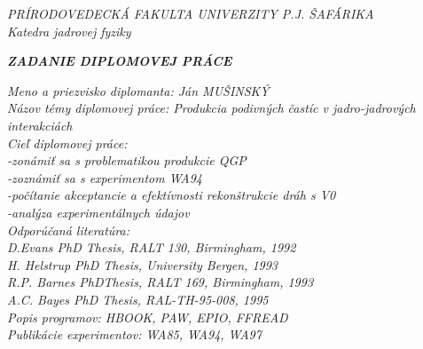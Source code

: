 \begin{titlepage}
  \parindent 0cm
  \begin{center}
    {\it PRÍRODOVEDECKÁ FAKULTA UNIVERZITY P.J. ŠAFÁRIKA \\
      Katedra jadrovej fyziky} \\
  \end{center}
  \vspace*{0.5cm}
  \begin{center}
    {\it {\bf ZADANIE DIPLOMOVEJ PRÁCE}}
  \end{center}
  \vspace*{0.5cm}
          {\it Meno a priezvisko diplomanta:  Ján MUŠINSKÝ \\

            Názov témy diplomovej práce:  Produkcia podivných častíc v jadro-jadrových \\
            \hspace*{5.5cm}interakciách \\

            Cieľ diplomovej práce:  \\
            \hspace*{3.5cm} -zonámiť sa s problematikou produkcie QGP \\
            \hspace*{3.5cm} -zoznámiť sa s experimentom WA94 \\
            \hspace*{3.5cm} -počítanie akceptancie a efektívnosti
            rekonštrukcie dráh s V0 \\
            \hspace*{3.5cm} -analýza experimentálnych údajov \\


            Odporúčaná literatúra: \\

            D.Evans PhD Thesis, RALT 130, Birmingham, 1992 \\
            H. Helstrup PhD Thesis, University Bergen, 1993 \\
            R.P. Barnes PhDThesis, RALT 169, Birmingham, 1993 \\
            A.C. Bayes PhD Thesis, RAL-TH-95-008, 1995 \\

            Popis programov: HBOOK, PAW, EPIO, FFREAD \\
            Publikácie experimentov: WA85, WA94, WA97 \\

}
\end{titlepage}
